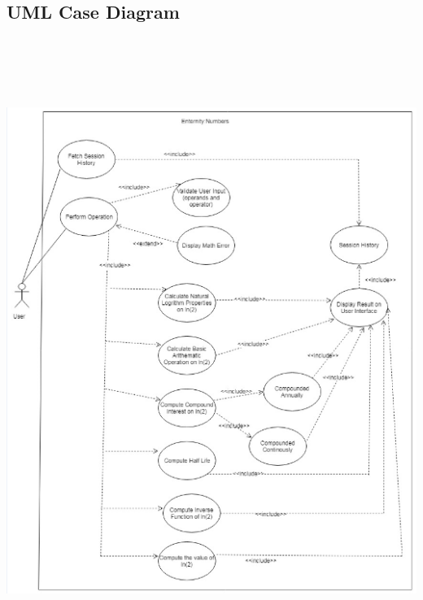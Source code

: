 \documentclass[12pt]{article}
\begin{document}
\subsection{UML Case Diagram}
\includegraphics[width=6.5in,height=8in]{./Problem5_UML_UseCase.png}
\end{document}
